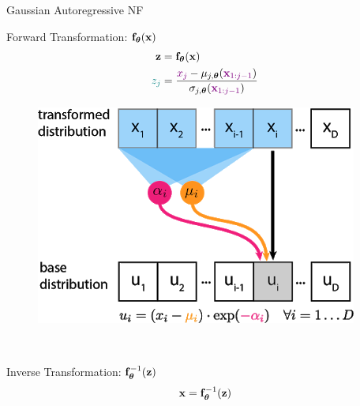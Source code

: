 \documentclass{beamer}
\begin{document}
\begin{frame}{Gaussian Autoregressive NF}
	\vspace{-0.5cm}

	\begin{minipage}[t]{0.65\columnwidth}
		\begin{block}{Forward Transformation: $\mathbf{f}_{\boldsymbol{\theta}}(\mathbf{x})$}
			\vspace{-0.5cm}
			\begin{align*}
				\mathbf{z} &= \mathbf{f}_{\boldsymbol{\theta}}(\mathbf{x}) \\ 
				{\color{teal} z_j} &= \frac{{\color{violet}x_j} - \mu_{j, \boldsymbol{\theta}}({\color{violet}\mathbf{x}_{1:j-1}})}{ \sigma_{j, \boldsymbol{\theta}} ({\color{violet}\mathbf{x}_{1:j-1}})}
			\end{align*}
			\vspace{-0.3cm}
		\end{block}
	\end{minipage}%
	\begin{minipage}[t]{0.35\columnwidth}
		\begin{figure}[h]
			\centering
			\includegraphics[width=.9\linewidth]{figs/af_iaf_explained_2.png}
		\end{figure}
	\end{minipage} \\
	\eqpause
	\begin{minipage}[t]{0.65\columnwidth}
		\begin{block}{Inverse Transformation: $\mathbf{f}^{-1}_{\boldsymbol{\theta}}(\mathbf{z})$}
			\vspace{-0.5cm}
			\begin{align*}
				\bx &= \bff^{-1}_{\btheta}(\bz) \\

\end{align*}
\end{block}
\end{minipage}
\end{frame}
\end{document}

